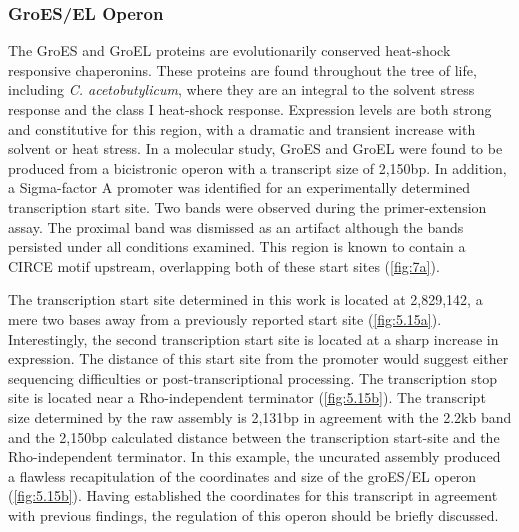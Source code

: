 \subsubsection{GroES/EL Operon}
The GroES and GroEL proteins are evolutionarily conserved heat-shock responsive chaperonins. These proteins are found throughout the tree of life, including \textit{C. acetobutylicum}, where they are an integral to the solvent stress response\cite{74,75,76} and the class I heat-shock response\cite{42,74,75}. Expression levels are both strong and constitutive for this region, with a dramatic and transient increase with solvent or heat stress\cite{74,75}. In a molecular study, GroES and GroEL were found to be produced from a bicistronic operon with a transcript size of 2,150bp\cite{76}. In addition, a Sigma-factor A promoter was identified for an experimentally determined transcription start site. Two bands were observed during the primer-extension assay\cite{76}. The proximal band was dismissed as an artifact although the bands persisted under all conditions examined\cite{76}. This region is known to contain a CIRCE motif upstream\cite{77}, overlapping both of these start sites (\ref{fig:7a})\cite{75}. 

The transcription start site determined in this work is located at 2,829,142, a mere two bases away from a previously reported start site\cite{76} (\ref{fig:5.15a}). Interestingly, the second transcription start site is located at a sharp increase in expression. The distance of this start site from the promoter would suggest either sequencing difficulties or post-transcriptional processing. The transcription stop site is located near a Rho-independent terminator (\ref{fig:5.15b}). The transcript size determined by the raw assembly is 2,131bp in agreement with the 2.2kb band and the 2,150bp calculated distance between the transcription start-site and the Rho-independent terminator\cite{77}. In this example, the uncurated assembly produced a flawless recapitulation of the coordinates and size of the groES/EL operon (\ref{fig:5.15b}). Having established the coordinates for this transcript in agreement with previous findings, the regulation of this operon should be briefly discussed.

